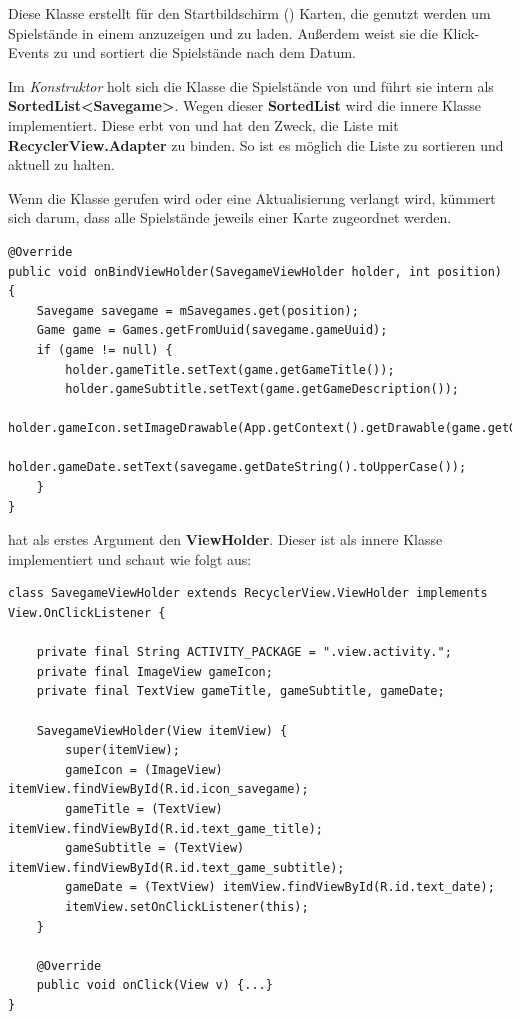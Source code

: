 Diese Klasse erstellt für den Startbildschirm () Karten, die
genutzt werden um Spielstände in einem  anzuzeigen und zu
laden. Außerdem weist sie die Klick-Events zu und sortiert die Spielstände nach
dem Datum.

Im \emph{Konstruktor} holt sich die Klasse die Spielstände von
 und führt sie intern als \textbf{SortedList<Savegame>}.
Wegen dieser \textbf{SortedList} wird die innere Klasse
 implementiert. Diese erbt von
 und hat den Zweck, die Liste mit
\textbf{RecyclerView.Adapter} zu binden. So ist es möglich die Liste zu
sortieren und aktuell zu halten.

Wenn die Klasse gerufen wird oder eine Aktualisierung verlangt wird, kümmert
sich  darum, dass alle
Spielstände jeweils einer Karte zugeordnet werden.

\begin{lstlisting}[caption={SavegameAdapter onBindViewHolder() Methode},captionpos=b]
@Override
public void onBindViewHolder(SavegameViewHolder holder, int position) {
	Savegame savegame = mSavegames.get(position);
	Game game = Games.getFromUuid(savegame.gameUuid);
	if (game != null) {
		holder.gameTitle.setText(game.getGameTitle());
		holder.gameSubtitle.setText(game.getGameDescription());
		holder.gameIcon.setImageDrawable(App.getContext().getDrawable(game.getGameIconId()));
		holder.gameDate.setText(savegame.getDateString().toUpperCase());
	}
}
\end{lstlisting}

 hat als erstes Argument den \textbf{ViewHolder}.
Dieser ist als innere Klasse implementiert und schaut wie folgt aus:

\begin{lstlisting}[caption={SavegameAdapter SavegameViewHolder Klasse},captionpos=b]
class SavegameViewHolder extends RecyclerView.ViewHolder implements View.OnClickListener {

	private final String ACTIVITY_PACKAGE = ".view.activity.";
	private final ImageView gameIcon;
	private final TextView gameTitle, gameSubtitle, gameDate;

	SavegameViewHolder(View itemView) {
		super(itemView);
		gameIcon = (ImageView) itemView.findViewById(R.id.icon_savegame);
		gameTitle = (TextView) itemView.findViewById(R.id.text_game_title);
		gameSubtitle = (TextView) itemView.findViewById(R.id.text_game_subtitle);
		gameDate = (TextView) itemView.findViewById(R.id.text_date);
		itemView.setOnClickListener(this);
	}

	@Override
	public void onClick(View v) {...}
}
\end{lstlisting}

